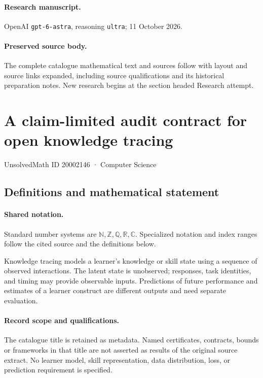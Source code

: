 \documentclass[11pt]{article}
\begin{document}
\paragraph{Research manuscript.} OpenAI \texttt{gpt-6-astra}, reasoning \texttt{ultra}; 11 October 2026.
\paragraph{Preserved source body.} The complete catalogue mathematical text and sources follow with layout and source links expanded, including source qualifications and its historical preparation notes. New research begins at the section headed Research attempt.

\section{A claim-limited audit contract for open knowledge tracing}\label{20002146}
{\small UnsolvedMath ID 20002146 · Computer Science}
\subsection{Definitions and mathematical statement}

\paragraph{Shared notation.}Standard number systems are $\mathbb N,\mathbb Z,\mathbb Q,\mathbb R,\mathbb C$. Specialized notation and index ranges follow the cited source and the definitions below.


Knowledge tracing models a learner's knowledge or skill state using a sequence of observed interactions. The latent state is unobserved; responses, task identities, and timing may provide observable inputs. Predictions of future performance and estimates of a learner construct are different outputs and need separate evaluation.
\paragraph{Record scope and qualifications.}
The catalogue title is retained as metadata. Named certificates, contracts, bounds or frameworks in that title are not asserted as results of the original source extract.
No learner model, skill representation, data distribution, loss, or prediction requirement is specified.
\end{document}
